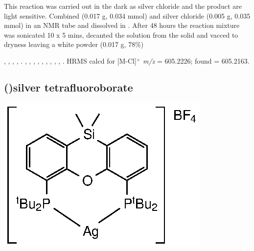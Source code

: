 This reaction was carried out in the dark as silver chloride and the product are light sensitive.  Combined \tBuxantphos{} (0.017 g, 0.034 mmol) and silver chloride (0.005 g, 0.035 mmol) in an NMR tube and dissolved in .  After 48 hours the reaction mixture was sonicated 10 x 5 mins, decanted the solution from the solid and vacced to dryness leaving a white powder (0.017 g, 78\%)

,
,
,
,
.
,
,
,
,
,
,
,
,
,
.
HRMS calcd for  [M-Cl]$^+$ \emph{m/z} = 605.2226; found = 605.2163.




\subsection*{(\tBuSixantphos)silver tetrafluoroborate}
\begin{structure}[h]
\begin{center}
\includegraphics{../Structures/SitBuSilverBF4.eps}
\end{center}
\end{structure}

